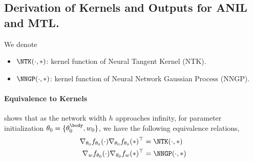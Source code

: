 \documentclass{article}
\begin{document}
\subsection{Derivation of Kernels and Outputs for ANIL and MTL.}\label{supp:proof:predictors&kernels}
\begin{notation} We denote
    \begin{itemize}
        \item $\NTK(\cdot,\ast)$: kernel function of Neural Tangent Kernel (NTK).
        \item $\NNGP(\cdot,\ast)$: kernel function of Neural Network Gaussian Process (NNGP).
    \end{itemize}
\end{notation}

\paragraph{Equivalence to Kernels} \citet{lee2019wide} shows that as the network width $h$ approaches infinity, for parameter initialization $\theta_0 = \{\theta_0^\body,w_0\}$, we have the following equivalence relations,
\begin{align}
    \nabla_{\theta_0} f_{\theta_0}(\cdot) \nabla_{\theta_0} f_{\theta_0}(\ast)^\top &= \NTK(\cdot, \ast) \\
    \nabla_{w} f_{\theta_0}(\cdot)  \nabla_{\theta_0} f_{w}(\ast)^\top &= \NNGP(\cdot, \ast)
\end{align}
\end{document}
